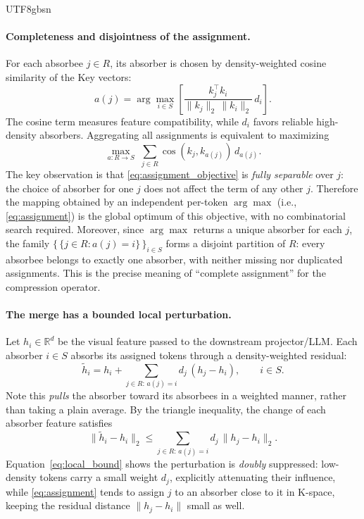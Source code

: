 \documentclass[10pt,twocolumn,letterpaper]{article}
\begin{document}
\begin{CJK}{UTF8}{gbsn}
\paragraph{Completeness and disjointness of the assignment.}
For each absorbee $j\in R$, its absorber is chosen by density-weighted cosine
similarity of the Key vectors:
\begin{equation}
    a(j)=\arg\max_{i\in S}
    \left[\frac{k_j^\top k_i}{\lVert k_j\rVert_2\,\lVert k_i\rVert_2}\,d_i\right].
    \label{eq:assignment}
\end{equation}
The cosine term measures feature compatibility, while $d_i$ favors reliable
high-density absorbers. Aggregating all assignments is equivalent to maximizing
\begin{equation}
    \max_{a:R\rightarrow S}\;\sum_{j\in R}
    \operatorname{cos}(k_j,k_{a(j)})\,d_{a(j)} .
    \label{eq:assignment_objective}
\end{equation}
The key observation is that \eqref{eq:assignment_objective} is \emph{fully
separable} over $j$: the choice of absorber for one $j$ does not affect the term
of any other $j$. Therefore the mapping obtained by an independent per-token
$\arg\max$ (i.e., \eqref{eq:assignment}) is the global optimum of this objective,
with no combinatorial search required. Moreover, since $\arg\max$ returns a
unique absorber for each $j$, the family
$\{\,\{j\in R:a(j)=i\}\,\}_{i\in S}$ forms a disjoint partition of $R$: every
absorbee belongs to exactly one absorber, with neither missing nor duplicated
assignments. This is the precise meaning of ``complete assignment'' for the
compression operator.

\paragraph{The merge has a bounded local perturbation.}
Let $h_i\in\mathbb{R}^{d}$ be the visual feature passed to the downstream
projector/LLM. Each absorber $i\in S$ absorbs its assigned tokens through a
density-weighted residual:
\begin{equation}
    \widetilde h_i=h_i+
    \sum_{j\in R:\,a(j)=i}d_j\,(h_j-h_i),\qquad i\in S.
    \label{eq:residual_merge}
\end{equation}
Note this \emph{pulls} the absorber toward its absorbees in a weighted manner,
rather than taking a plain average. By the triangle inequality, the change of
each absorber feature satisfies
\begin{equation}
    \bigl\lVert\widetilde h_i-h_i\bigr\rVert_2
    \le\sum_{j\in R:\,a(j)=i}d_j\,\bigl\lVert h_j-h_i\bigr\rVert_2 .
    \label{eq:local_bound}
\end{equation}
Equation~\eqref{eq:local_bound} shows the perturbation is \emph{doubly}
suppressed: low-density tokens carry a small weight $d_j$, explicitly attenuating
their influence, while \eqref{eq:assignment} tends to assign $j$ to an absorber
close to it in K-space, keeping the residual distance
$\lVert h_j-h_i\rVert$ small as well.


\end{CJK}
\end{document}
